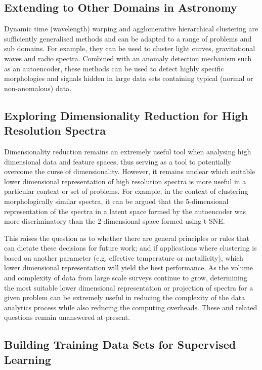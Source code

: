 \subsection{Extending to Other Domains in Astronomy}

Dynamic time (wavelength) warping and agglomerative hierarchical clustering are sufficiently generalised methods and can be adapted to a range of problems and sub domains. For example, they can be used to cluster light curves, gravitational waves and radio spectra. Combined with an anomaly detection mechanism such as an autoencoder, these methods can be used to detect highly specific morphologies and signals hidden in large data sets containing typical (normal or non-anomalous) data. 

\subsection{Exploring Dimensionality Reduction for High Resolution Spectra}

Dimensionality reduction remains an extremely useful tool when analysing high dimensional data and feature spaces, thus serving as a tool to potentially overcome the curse of dimensionality. However, it remains unclear which suitable lower dimensional representation of high resolution spectra is more useful in a particular context or set of problems. For example, in the context of clustering morphologically similar spectra, it can be argued that the 5-dimensional representation of the spectra in a latent space formed by the autoencoder was more discriminatory than the 2-dimensional space formed using t-SNE. 

This raises the question as to whether there are general principles or rules that can dictate these decisions for future work; and if applications where clustering is based on another parameter (e.g. effective temperature or metallicity), which lower dimensional representation will yield the best performance. As the volume and complexity of data from large scale surveys continue to grow, determining the most suitable lower dimensional representation or projection of spectra for a given problem can be extremely useful in reducing the complexity of the data analytics process while also reducing the computing overheads. These and related questions remain unanswered at present.

\subsection{Building Training Data Sets for Supervised Learning}

